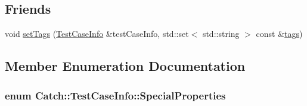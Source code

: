 \subsection*{Friends}
\begin{DoxyCompactItemize}
\item 
void \hyperlink{structCatch_1_1TestCaseInfo_addc10c770e56f49da5baa0c76cf25bd5}{set\-Tags} (\hyperlink{structCatch_1_1TestCaseInfo}{Test\-Case\-Info} \&test\-Case\-Info, std\-::set$<$ std\-::string $>$ const \&\hyperlink{structCatch_1_1TestCaseInfo_a045f62e7719a8760a5b456f7fd2dc97c}{tags})
\end{DoxyCompactItemize}


\subsection{Member Enumeration Documentation}
\hypertarget{structCatch_1_1TestCaseInfo_a39b232f74b4a7a6f2183b96759027eac}{
\subsubsection[{Special\-Properties}]{\setlength{\rightskip}{0pt plus 5cm}enum {\bf Catch\-::\-Test\-Case\-Info\-::\-Special\-Properties}}}\label{structCatch_1_1TestCaseInfo_a39b232f74b4a7a6f2183b96759027eac}
